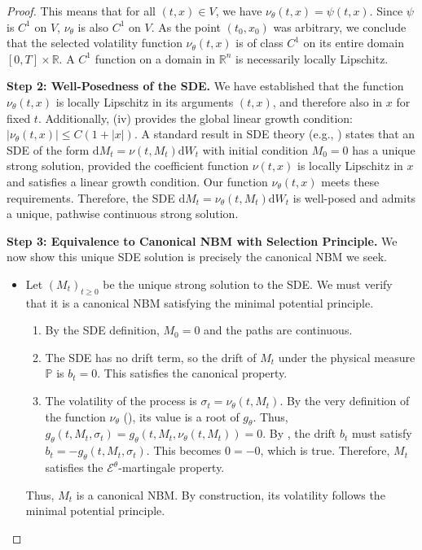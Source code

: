 \documentclass[qian]{imsart}
\newcommand{\R}{\mathbb{R}}
\newcommand{\Prob}{\mathbb{P}}
\newcommand{\cEneutheta}{\mathcal{E}^{\theta}}
\newcommand{\dd}{\mathrm{d}}
\theoremstyle{plain}
\theoremstyle{definition}
\begin{document}
\begin{proof}
This means that for all $(t,x) \in V$, we have $\nu_\theta(t,x) = \psi(t,x)$. Since $\psi$ is $C^1$ on $V$, $\nu_\theta$ is also $C^1$ on $V$. As the point $(t_0, x_0)$ was arbitrary, we conclude that the selected volatility function $\nu_\theta(t,x)$ is of class $C^1$ on its entire domain $[0,T] \times \R$. A $C^1$ function on a domain in $\R^n$ is necessarily locally Lipschitz.

\textbf{Step 2: Well-Posedness of the SDE.}
We have established that the function $\nu_\theta(t,x)$ is locally Lipschitz in its arguments $(t,x)$, and therefore also in $x$ for fixed $t$. Additionally, (iv) provides the global linear growth condition: $|\nu_\theta(t,x)| \le C(1+|x|)$.
A standard result in SDE theory (e.g., \cite{karatzas2012brownian}) states that an SDE of the form $\dd M_t = \nu(t, M_t) \dd W_t$ with initial condition $M_0=0$ has a unique strong solution, provided the coefficient function $\nu(t,x)$ is locally Lipschitz in $x$ and satisfies a linear growth condition. Our function $\nu_\theta(t,x)$ meets these requirements. Therefore, the SDE $\dd M_t = \nu_\theta(t, M_t) \dd W_t$ is well-posed and admits a unique, pathwise continuous strong solution.

\textbf{Step 3: Equivalence to Canonical NBM with Selection Principle.}
We now show this unique SDE solution is precisely the canonical NBM we seek.
\begin{itemize}
    \item[\textbf{($\impliedby$) Sufficiency:}] Let $(M_t)_{t \ge 0}$ be the unique strong solution to the SDE. We must verify that it is a canonical NBM satisfying the minimal potential principle.
    \begin{enumerate}
        \item By the SDE definition, $M_0=0$ and the paths are continuous.
        \item The SDE has no drift term, so the drift of $M_t$ under the physical measure $\Prob$ is $b_t=0$. This satisfies the canonical property.
        \item The volatility of the process is $\sigma_t = \nu_\theta(t, M_t)$. By the very definition of the function $\nu_\theta$ (), its value is a root of $g_\theta$. Thus, $g_\theta(t, M_t, \sigma_t) = g_\theta(t, M_t, \nu_\theta(t, M_t)) = 0$. By , the drift $b_t$ must satisfy $b_t = -g_\theta(t, M_t, \sigma_t)$. This becomes $0 = -0$, which is true. Therefore, $M_t$ satisfies the $\cEneutheta$-martingale property.
    \end{enumerate}
    Thus, $M_t$ is a canonical NBM. By construction, its volatility follows the minimal potential principle.


\end{itemize}
\end{proof}
\end{document}
